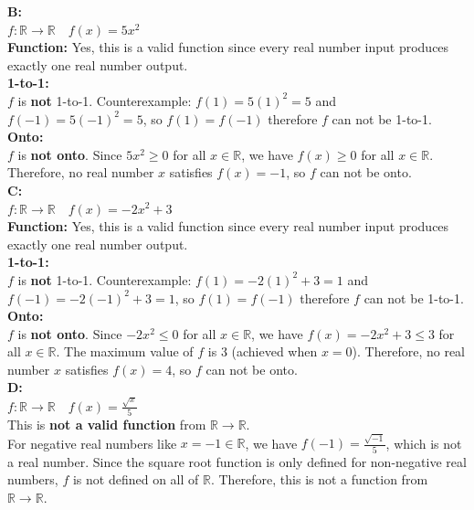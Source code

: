 \documentclass[10pt]{exam}
\begin{document}
\begin{questions}
\begin{solution}
    \textbf{B:}\\ 
    $f: \mathbb{R} \rightarrow \mathbb{R} \quad f(x) = 5x^2$\\
    \textbf{Function:} Yes, this is a valid function since every real number input produces exactly one real number output.\\
    \textbf{1-to-1:}\\
    $f$ is \textbf{not} 1-to-1. Counterexample: $f(1) = 5(1)^2 = 5$ and $f(-1) = 5(-1)^2 = 5$, so $f(1) = f(-1)$ therefore $f$ can not be 1-to-1.\\
    \textbf{Onto:}\\
    $f$ is \textbf{not onto}. Since $5x^2 \geq 0$ for all $x \in \mathbb{R}$, we have $f(x) \geq 0$ for all $x \in \mathbb{R}$. Therefore, no real number $x$ satisfies $f(x) = -1$, so $f$ can not be onto.\\
    
    \textbf{C:}\\ 
    $f: \mathbb{R} \rightarrow \mathbb{R} \quad f(x) = -2x^2+3$\\
    \textbf{Function:} Yes, this is a valid function since every real number input produces exactly one real number output.\\
    \textbf{1-to-1:}\\
    $f$ is \textbf{not} 1-to-1. Counterexample: $f(1) = -2(1)^2 + 3 = 1$ and $f(-1) = -2(-1)^2 + 3 = 1$, so $f(1) = f(-1)$ therefore $f$ can not be 1-to-1.\\
    \textbf{Onto:}\\
    $f$ is \textbf{not onto}. Since $-2x^2 \leq 0$ for all $x \in \mathbb{R}$, we have $f(x) = -2x^2 + 3 \leq 3$ for all $x \in \mathbb{R}$. The maximum value of $f$ is 3 (achieved when $x = 0$). Therefore, no real number $x$ satisfies $f(x) = 4$, so $f$ can not be onto.\\
    
    \textbf{D:}\\ 
    $f: \mathbb{R} \rightarrow \mathbb{R} \quad f(x) = \frac{\sqrt{x}}{5}$\\
    This is \textbf{not a valid function} from $\mathbb{R} \to \mathbb{R}$.\\
    For negative real numbers like $x = -1 \in \mathbb{R}$, we have $f(-1) = \frac{\sqrt{-1}}{5}$, which is not a real number. Since the square root function is only defined for non-negative real numbers, $f$ is not defined on all of $\mathbb{R}$. Therefore, this is not a function from $\mathbb{R} \to \mathbb{R}$.\\


\end{solution}
\end{questions}
\end{document}
